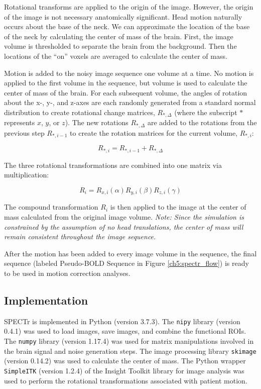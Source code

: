Rotational transforms are applied to the origin of the image. However, the origin of the image is not necessary anatomically significant. Head motion naturally occurs about the base of the neck. We can approximate the location of the base of the neck by calculating the center of mass of the brain. First, the image volume is thresholded to separate the brain from the background. Then the locations of the ``on'' voxels are averaged to calculate the center of mass. 

Motion is added to the noisy image sequence one volume at a time. No motion is applied to the first volume in the sequence, but volume is used to calculate the center of mass of the brain. For each subsequent volume, the angles of rotation about the x-, y-, and z-axes are each randomly generated from a standard normal distribution to create rotational change matrices, $R_{*,\Delta}$ (where the subscript $*$ represents $x$, $y$, or $z$). The new rotations $R_{*,\Delta}$ are added to the rotations from the previous step $R_{*,i-1}$ to create the rotation matrices for the current volume, $R_{*,i}$:

\begin{equation}
R_{*,i} = R_{*,i-1} + R_{*,\Delta}
\end{equation}

The three rotational transformations are combined into one matrix via multiplication: 

\begin{equation}
R_i = R_{x, i}(\alpha) R_{y,i}(\beta) R_{z,i}(\gamma)
\end{equation}

The compound transformation $R_i$ is then applied to the image at the center of mass calculated from the original image volume. \textit{Note: Since the simulation is constrained by the assumption of no head translations, the center of mass will remain consistent throughout the image sequence.}

After the motion has been added to every image volume in the sequence, the final sequence (labeled Pseudo-BOLD Sequence in Figure \ref{ch5:spectr_flow}) is ready to be used in motion correction analyses.

\subsection{Implementation}

SPECTr is implemented in Python (version 3.7.3). The \lstinline{nipy} library (version 0.4.1) was used to load images, save images, and combine the functional ROIs. The \lstinline{numpy} library (version 1.17.4) was used for matrix manipulations involved in the brain signal and noise generation steps. The image processing library \lstinline{skimage} (version 0.14.2) was used to calculate the center of mass. The Python wrapper \lstinline{SimpleITK} (version 1.2.4) of the Insight Toolkit library for image analysis was used to perform the rotational transformations associated with patient motion.

